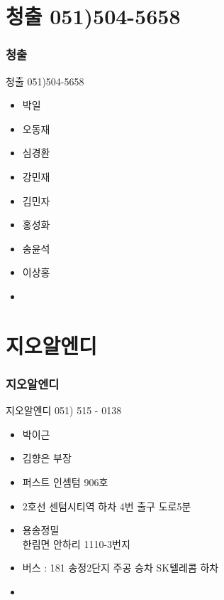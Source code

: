 \documentclass[aspectratio=1610,20pt,xcolor=pdftex,dvipsnames,table,handout]{beamer}
\begin{document}
		\section{청출 051)504-5658}
		\begin{frame} [t,plain]
		\frametitle{청출}
			\begin{block} {청출 051)504-5658}
			\setlength{\leftmargini}{1em}			
			\begin{itemize}
				\item 박일
				\item 오동재
				\item 심경환
				\item 강민재
				\item 김민자
				\item 홍성화
				\item 송윤석
				\item 이상홍
				\item 
			\end{itemize}
			\end{block}			

								
		\end{frame}						
	

		\section{지오알엔디 }
		\begin{frame} [t,plain]
		\frametitle{지오알엔디}
			\begin{block} {지오알엔디 051) 515 - 0138 }
			\setlength{\leftmargini}{1em}			
			\begin{itemize}
				\item 박이근
				\item 김향은 부장
				\item 퍼스트 인셈텀 906호
				\item 2호선 센텀시티역 하차 4번 출구 도로5분
				\item 용송정밀 \\한림면 안하리 1110-3번지
				\item 버스 : 181 송정2단지 주공 승차 SK텔레콤 하차
				\item 
			\end{itemize}
			\end{block}			
		\end{frame}						

		\begin{frame} [t,plain]
		\end{frame}						
		\begin{frame} [t,plain]
		\end{frame}						
\end{document}
